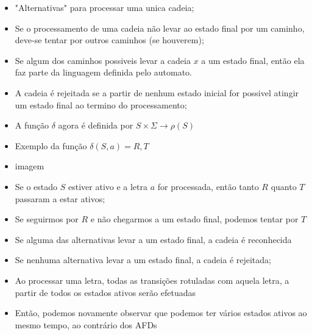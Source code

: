 \documentclass[12pt]{article}
\begin{document}
\begin{itemize}
\begin{itemize}
        \end{itemize}
        \item "Alternativas" para processar uma unica cadeia;
        \item Se o processamento de uma cadeia não levar ao estado final por um 
        caminho, deve-se tentar por outros caminhos (se houverem);
        \item Se algum dos caminhos possiveis levar a cadeia $x$ a um estado 
        final, então ela faz parte da linguagem definida pelo automato.
        \item A cadeia é rejeitada se a partir de nenhum estado inicial for 
        possivel atingir um estado final ao termino do processamento;
        \item A função $\delta$ agora é definida por $S \times\Sigma\rightarrow
        \rho(S)$
        \item Exemplo da função $\delta(S,a)={R,T}$
        \item[] imagem
        \item Se o estado $S$ estiver ativo e a letra $a$ for processada, então 
        tanto $R$ quanto $T$ passaram a estar ativos;
        \item Se seguirmos por $R$ e não chegarmos a um estado final, podemos 
        tentar por $T$
        \item Se alguma das alternativas levar a um estado final, a cadeia é 
        reconhecida
        \item Se nenhuma alternativa levar a um estado final, a cadeia é rejeitada;
        \item Ao processar uma letra, todas as transições rotuladas com aquela 
        letra, a partir de todos os estados ativos serão efetuadas
        \item Então, podemos novamente observar que podemos ter vários estados 
        ativos ao mesmo tempo, ao contrário dos AFDs
    \end{itemize}
\end{document}

